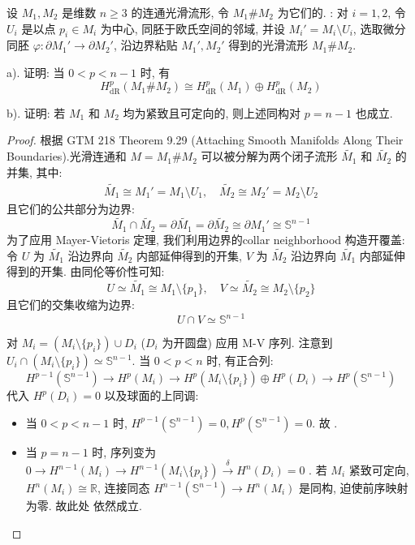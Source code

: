\documentclass[../main.tex]{subfiles}
\begin{document}
\begin{exercise}{}{}
设 $M_1,M_2$ 是维数 $n\geqslant 3$ 的连通光滑流形, 令 $M_1\#M_2$ 为它们的. : 对 $i=1,2$, 令 $U_i$ 是以点 $p_i\in M_i$ 为中心, 同胚于欧氏空间的邻域, 并设 $M_i'=M_i\setminus U_i$, 选取微分同胚 $\varphi:\partial M_1'\to\partial M_2'$, 沿边界粘贴 $M_1',M_2'$ 得到的光滑流形 $M_1\#M_2$.

a). 证明: 当 $0<p<n-1$ 时, 有
$$H_{\operatorname{dR}}^p(M_1\#M_2)\cong H_{\operatorname{dR}}^p(M_1)\oplus H_{\operatorname{dR}}^p(M_2)$$

b). 证明: 若 $M_1$ 和 $M_2$ 均为紧致且可定向的, 则上述同构对 $p=n-1$ 也成立.
\end{exercise}
\begin{proof}
根据 GTM 218 Theorem 9.29 (Attaching Smooth Manifolds Along Their Boundaries).光滑连通和 $M=M_1 \# M_2$ 可以被分解为两个闭子流形 $\widetilde{M_1}$ 和 $\widetilde{M_2}$ 的并集, 其中:
$$\begin{aligned} \widetilde{M_1} \cong M_1' = M_1 \setminus U_1, \quad \widetilde{M_2} \cong M_2' = M_2 \setminus U_2 \end{aligned}$$
且它们的公共部分为边界:
$$\widetilde{M_1} \cap \widetilde{M_2} = \partial \widetilde{M_1} = \partial \widetilde{M_2} \cong \partial M_1' \cong \mathbb{S}^{n-1}$$
为了应用 Mayer-Vietoris 定理, 我们利用边界的collar neighborhood 构造开覆盖:
令 $U$ 为 $\widetilde{M_1}$ 沿边界向 $\widetilde{M_2}$ 内部延伸得到的开集, $V$ 为 $\widetilde{M_2}$ 沿边界向 $\widetilde{M_1}$ 内部延伸得到的开集. 由同伦等价性可知:
$$U \simeq \widetilde{M_1} \cong M_1 \setminus \{p_1\}, \quad V \simeq \widetilde{M_2} \cong M_2 \setminus \{p_2\}$$
且它们的交集收缩为边界:
$$U \cap V \simeq \mathbb{S}^{n-1}$$

对 $M_i = (M_i \setminus \{p_i\}) \cup D_i$ ($D_i$ 为开圆盘) 应用 M-V 序列. 注意到 $U_i \cap (M_i \setminus \{p_i\}) \simeq \mathbb{S}^{n-1}$.
当 $0 < p < n$ 时, 有正合列:
$$H^{p-1}(\mathbb{S}^{n-1}) \to H^p(M_i) \to H^p(M_i \setminus \{p_i\}) \oplus H^p(D_i) \to H^p(\mathbb{S}^{n-1})$$
代入 $H^p(D_i)=0$ 以及球面的上同调:
\begin{itemize}
    \item 当 $0 < p < n-1$ 时, $H^{p-1}(\mathbb{S}^{n-1})=0, H^p(\mathbb{S}^{n-1})=0$. 故 .
    \item 当 $p = n-1$ 时, 序列变为 $0 \to H^{n-1}(M_i) \to H^{n-1}(M_i \setminus \{p_i\}) \xrightarrow{\delta} H^n(D_i)=0$ .  若 $M_i$ 紧致可定向, $H^n(M_i) \cong \mathbb{R}$, 连接同态 $H^{n-1}(\mathbb{S}^{n-1}) \to H^n(M_i)$ 是同构, 迫使前序映射为零. 故此处  依然成立.


\end{itemize}
\end{proof}
\end{document}
